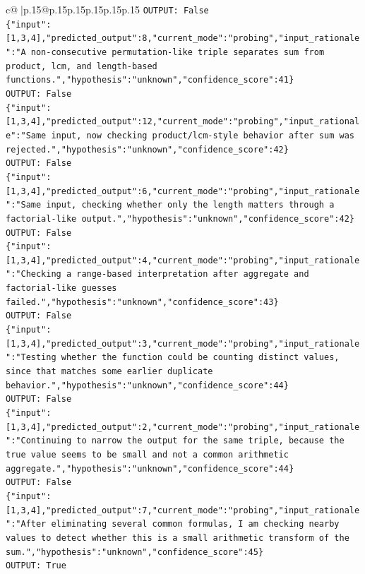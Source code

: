 \documentclass{article}
\begin{document}
{\begin{supertabular}{c@{$\;$}|p{.15\linewidth}@{}p{.15\linewidth}p{.15\linewidth}p{.15\linewidth}p{.15\linewidth}p{.15\linewidth}}
{{{\texttt{OUTPUT: False} \\
\texttt{\{"input":{[}1,3,4{]},"predicted\_output":8,"current\_mode":"probing","input\_rationale":"A non{-}consecutive permutation{-}like triple separates sum from product, lcm, and length{-}based functions.","hypothesis":"unknown","confidence\_score":41\}} \\
\texttt{OUTPUT: False} \\
\texttt{\{"input":{[}1,3,4{]},"predicted\_output":12,"current\_mode":"probing","input\_rationale":"Same input, now checking product/lcm{-}style behavior after sum was rejected.","hypothesis":"unknown","confidence\_score":42\}} \\
\texttt{OUTPUT: False} \\
\texttt{\{"input":{[}1,3,4{]},"predicted\_output":6,"current\_mode":"probing","input\_rationale":"Same input, checking whether only the length matters through a factorial{-}like output.","hypothesis":"unknown","confidence\_score":42\}} \\
\texttt{OUTPUT: False} \\
\texttt{\{"input":{[}1,3,4{]},"predicted\_output":4,"current\_mode":"probing","input\_rationale":"Checking a range{-}based interpretation after aggregate and factorial{-}like guesses failed.","hypothesis":"unknown","confidence\_score":43\}} \\
\texttt{OUTPUT: False} \\
\texttt{\{"input":{[}1,3,4{]},"predicted\_output":3,"current\_mode":"probing","input\_rationale":"Testing whether the function could be counting distinct values, since that matches some earlier duplicate behavior.","hypothesis":"unknown","confidence\_score":44\}} \\
\texttt{OUTPUT: False} \\
\texttt{\{"input":{[}1,3,4{]},"predicted\_output":2,"current\_mode":"probing","input\_rationale":"Continuing to narrow the output for the same triple, because the true value seems to be small and not a common arithmetic aggregate.","hypothesis":"unknown","confidence\_score":44\}} \\
\texttt{OUTPUT: False} \\
\texttt{\{"input":{[}1,3,4{]},"predicted\_output":7,"current\_mode":"probing","input\_rationale":"After eliminating several common formulas, I am checking nearby values to detect whether this is a small arithmetic transform of the sum.","hypothesis":"unknown","confidence\_score":45\}} \\
\texttt{OUTPUT: True} \\
}}}
\end{supertabular}}
\end{document}
